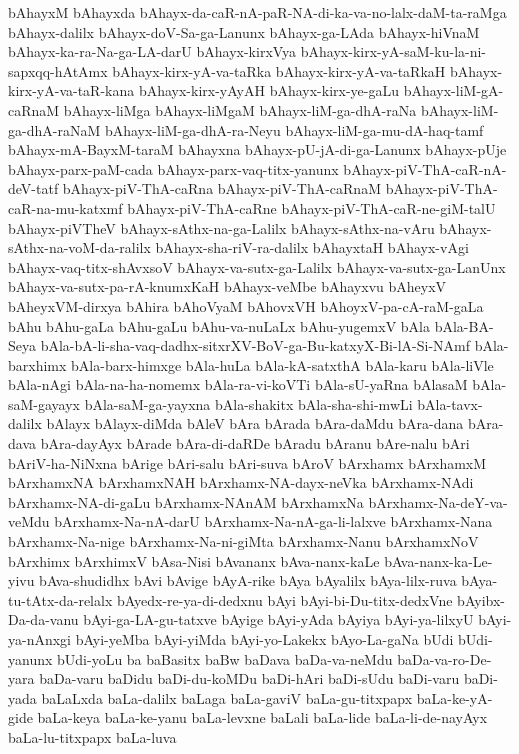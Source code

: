 {bAhayxM
bAhayxda
bAhayx-da-caR-nA-paR-NA-di-ka-va-no-lalx-daM-ta-raMga
bAhayx-dalilx
bAhayx-doV-Sa-ga-Lanunx
bAhayx-ga-LAda
bAhayx-hiVnaM
bAhayx-ka-ra-Na-ga-LA-darU
bAhayx-kirxVya
bAhayx-kirx-yA-saM-ku-la-ni-sapxqq-hAtAmx
bAhayx-kirx-yA-va-taRka
bAhayx-kirx-yA-va-taRkaH
bAhayx-kirx-yA-va-taR-kana
bAhayx-kirx-yAyAH
bAhayx-kirx-ye-gaLu
bAhayx-liM-gA-caRnaM
bAhayx-liMga
bAhayx-liMgaM
bAhayx-liM-ga-dhA-raNa
bAhayx-liM-ga-dhA-raNaM
bAhayx-liM-ga-dhA-ra-Neyu
bAhayx-liM-ga-mu-dA-haq-tamf
bAhayx-mA-BayxM-taraM
bAhayxna
bAhayx-pU-jA-di-ga-Lanunx
bAhayx-pUje
bAhayx-parx-paM-cada
bAhayx-parx-vaq-titx-yanunx
bAhayx-piV-ThA-caR-nA-deV-tatf
bAhayx-piV-ThA-caRna
bAhayx-piV-ThA-caRnaM
bAhayx-piV-ThA-caR-na-mu-katxmf
bAhayx-piV-ThA-caRne
bAhayx-piV-ThA-caR-ne-giM-talU
bAhayx-piVTheV
bAhayx-sAthx-na-ga-Lalilx
bAhayx-sAthx-na-vAru
bAhayx-sAthx-na-voM-da-ralilx
bAhayx-sha-riV-ra-dalilx
bAhayxtaH
bAhayx-vAgi
bAhayx-vaq-titx-shAvxsoV
bAhayx-va-sutx-ga-Lalilx
bAhayx-va-sutx-ga-LanUnx
bAhayx-va-sutx-pa-rA-knumxKaH
bAhayx-veMbe
bAhayxvu
bAheyxV
bAheyxVM-dirxya
bAhira
bAhoVyaM
bAhovxVH
bAhoyxV-pa-cA-raM-gaLa
bAhu
bAhu-gaLa
bAhu-gaLu
bAhu-va-nuLaLx
bAhu-yugemxV
bAla
bAla-BA-Seya
bAla-bA-li-sha-vaq-dadhx-sitxrXV-BoV-ga-Bu-katxyX-Bi-lA-Si-NAmf
bAla-barxhimx
bAla-barx-himxge
bAla-huLa
bAla-kA-satxthA
bAla-karu
bAla-liVle
bAla-nAgi
bAla-na-ha-nomemx
bAla-ra-vi-koVTi
bAla-sU-yaRna
bAlasaM
bAla-saM-gayayx
bAla-saM-ga-yayxna
bAla-shakitx
bAla-sha-shi-mwLi
bAla-tavx-dalilx
bAlayx
bAlayx-diMda
bAleV
bAra
bArada
bAra-daMdu
bAra-dana
bAra-dava
bAra-dayAyx
bArade
bAra-di-daRDe
bAradu
bAranu
bAre-nalu
bAri
bAriV-ha-NiNxna
bArige
bAri-salu
bAri-suva
bAroV
bArxhamx
bArxhamxM
bArxhamxNA
bArxhamxNAH
bArxhamx-NA-dayx-neVka
bArxhamx-NAdi
bArxhamx-NA-di-gaLu
bArxhamx-NAnAM
bArxhamxNa
bArxhamx-Na-deY-va-veMdu
bArxhamx-Na-nA-darU
bArxhamx-Na-nA-ga-li-lalxve
bArxhamx-Nana
bArxhamx-Na-nige
bArxhamx-Na-ni-giMta
bArxhamx-Nanu
bArxhamxNoV
bArxhimx
bArxhimxV
bAsa-Nisi
bAvananx
bAva-nanx-kaLe
bAva-nanx-ka-Le-yivu
bAva-shudidhx
bAvi
bAvige
bAyA-rike
bAya
bAyalilx
bAya-lilx-ruva
bAya-tu-tAtx-da-relalx
bAyedx-re-ya-di-dedxnu
bAyi
bAyi-bi-Du-titx-dedxVne
bAyibx-Da-da-vanu
bAyi-ga-LA-gu-tatxve
bAyige
bAyi-yAda
bAyiya
bAyi-ya-lilxyU
bAyi-ya-nAnxgi
bAyi-yeMba
bAyi-yiMda
bAyi-yo-Lakekx
bAyo-La-gaNa
bUdi
bUdi-yanunx
bUdi-yoLu
ba
baBasitx
baBw
baDava
baDa-va-neMdu
baDa-va-ro-De-yara
baDa-varu
baDidu
baDi-du-koMDu
baDi-hAri
baDi-sUdu
baDi-varu
baDi-yada
baLaLxda
baLa-dalilx
baLaga
baLa-gaviV
baLa-gu-titxpapx
baLa-ke-yA-gide
baLa-keya
baLa-ke-yanu
baLa-levxne
baLali
baLa-lide
baLa-li-de-nayAyx
baLa-lu-titxpapx
baLa-luva
}
